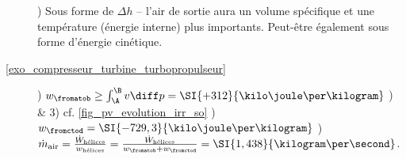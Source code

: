 \begin{description}
					) Sous forme de $\Delta h$ -- l’air de sortie aura un volume spécifique et une température (énergie interne) plus importants. Peut-être également sous forme d’énergie cinétique.
	\item [\ref{exo_compresseur_turbine_turbopropulseur}] 
					) $w_\fromatob \geq \int_\A^\B v \diff p = \SI{+312}{\kilo\joule\per\kilogram}$
					) \& 3) cf. \cref{fig_pv_evolution_irr_so}
					) $w_\fromctod = \SI{-729,3}{\kilo\joule\per\kilogram}$
					) $\dot{m}_\text{air} = \frac{\dot{W}_\text{hélices}}{w_\text{hélices}} = \frac{\dot{W}_\text{hélices}}{w_\fromatob + w_\fromctod} = \SI{1,438}{\kilogram\per\second}$.
\end{description}

